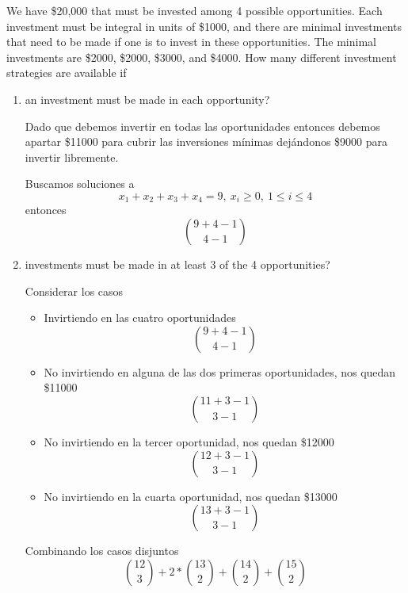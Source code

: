 \item We have \$20,000 that must be invested among 4 possible opportunities. Each investment must be integral in units of \$1000, and there are minimal investments that need to be made if one is to invest in these opportunities. The minimal investments are \$2000, \$2000, \$3000, and \$4000. How many different investment strategies are available if
\begin{enumerate}
    \item an investment must be made in each opportunity?

    Dado que debemos invertir en todas las oportunidades entonces debemos apartar \$11000 para cubrir las inversiones mínimas dejándonos \$9000 para invertir libremente.

    Buscamos soluciones a
    \[ x_1 + x_2 + x_3 + x_4 = 9,\ x_i \ge 0,\ 1 \le i \le 4 \]
    entonces
    \[ \binom{9+4-1}{4-1} \]
    
    \item investments must be made in at least 3 of the 4 opportunities?

    Considerar los casos
    \begin{itemize}
        \item Invirtiendo en las cuatro oportunidades
        \[ \binom{9+4-1}{4-1} \]
        \item No invirtiendo en alguna de las dos primeras oportunidades, nos quedan \$11000
        \[ \binom{11+3-1}{3-1} \]
        \item No invirtiendo en la tercer oportunidad, nos quedan \$12000
        \[ \binom{12+3-1}{3-1} \]
        \item No invirtiendo en la cuarta oportunidad, nos quedan \$13000
        \[ \binom{13+3-1}{3-1} \]
    \end{itemize}
    Combinando los casos disjuntos
    \[ \binom{12}{3} + 2 * \binom{13}{2} + \binom{14}{2} + \binom{15}{2} \]
    
\end{enumerate}